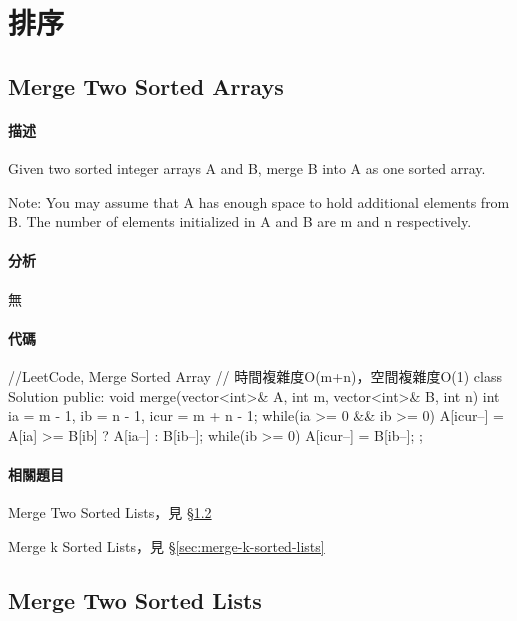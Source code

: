 \chapter{排序}

\section{Merge Two Sorted Arrays} %
\label{sec:merge-two-sorted-arrays}


\subsubsection{描述}
Given two sorted integer arrays A and B, merge B into A as one sorted array.

Note:
You may assume that A has enough space to hold additional elements from B. The number of elements initialized in A and B are m and n respectively.


\subsubsection{分析}
無


\subsubsection{代碼}
\begin{Code}
//LeetCode, Merge Sorted Array
// 時間複雜度O(m+n)，空間複雜度O(1)
class Solution {
public:
    void merge(vector<int>& A, int m, vector<int>& B, int n) {
        int ia = m - 1, ib = n - 1, icur = m + n - 1;
        while(ia >= 0 && ib >= 0) {
            A[icur--] = A[ia] >= B[ib] ? A[ia--] : B[ib--];
        }
        while(ib >= 0) {
            A[icur--] = B[ib--];
        }
    }
};
\end{Code}


\subsubsection{相關題目}
\begindot
\item Merge Two Sorted Lists，見 \S \ref{sec:merge-two-sorted-lists}
\item Merge k Sorted Lists，見 \S \ref{sec:merge-k-sorted-lists}
\myenddot


\section{Merge Two Sorted Lists} %
\label{sec:merge-two-sorted-lists}


